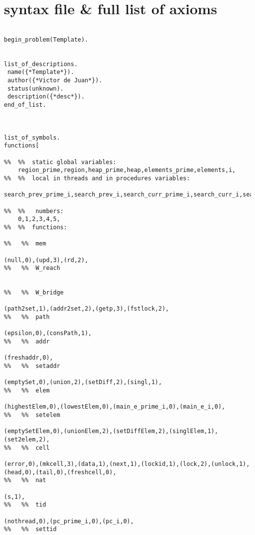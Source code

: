 \chapter{\spass\; syntax file \& full list of axioms}
\label{spass:syntax_file}
\begin{lstlisting}

begin_problem(Template).


list_of_descriptions.
 name({*Template*}).
 author({*Victor de Juan*}).
 status(unknown).
 description({*desc*}).
end_of_list.



list_of_symbols.
functions[

%%  %%  static global variables:
    region_prime,region,heap_prime,heap,elements_prime,elements,i,
%%  %%  local in threads and in procedures variables:
    search_prev_prime_i,search_prev_i,search_curr_prime_i,search_curr_i,search_aux_prime_i,search_aux_i,search_e_prime_i,search_e_i,search_e_prime_i,search_e_i,search_e_prime_i,search_e_i,remove_prev_prime_i,remove_prev_i,remove_curr_prime_i,remove_curr_i,remove_aux_prime_i,remove_aux_i,remove_e_prime_i,remove_e_i,remove_e_prime_i,remove_e_i,remove_e_prime_i,remove_e_i,insert_prev_prime_i,insert_prev_i,insert_curr_prime_i,insert_curr_i,insert_aux_prime_i,insert_aux_i,insert_e_prime_i,insert_e_i,insert_e_prime_i,insert_e_i,insert_e_prime_i,insert_e_i,

%%  %%   numbers: 
    0,1,2,3,4,5,
%%  %%  functions:
    
%%   %%  mem

(null,0),(upd,3),(rd,2),
%%   %%  W_reach


%%   %%  W_bridge

(path2set,1),(addr2set,2),(getp,3),(fstlock,2),
%%   %%  path

(epsilon,0),(consPath,1),
%%   %%  addr

(freshaddr,0),
%%   %%  setaddr

(emptySet,0),(union,2),(setDiff,2),(singl,1),
%%   %%  elem

(highestElem,0),(lowestElem,0),(main_e_prime_i,0),(main_e_i,0),
%%   %%  setelem

(emptySetElem,0),(unionElem,2),(setDiffElem,2),(singlElem,1),(set2elem,2),
%%   %%  cell

(error,0),(mkcell,3),(data,1),(next,1),(lockid,1),(lock,2),(unlock,1),(head,0),(tail,0),(freshcell,0),
%%   %%  nat

(s,1),
%%   %%  tid

(nothread,0),(pc_prime_i,0),(pc_i,0),
%%   %%  settid


\end{lstlisting}

